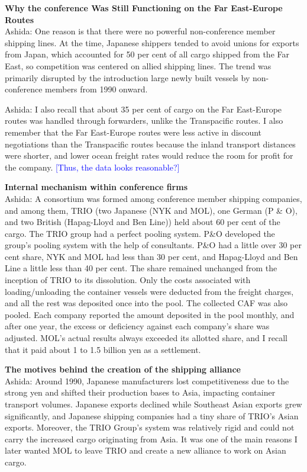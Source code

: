 \textbf{Why the conference Was Still Functioning on the Far East-Europe Routes}\\
Ashida: One reason is that there were no powerful non-conference member shipping lines. At the time, Japanese shippers tended to avoid unions for exports from Japan, which accounted for 50 per cent of all cargo shipped from the Far East, so competition was centered on allied shipping lines. The trend was primarily disrupted by the introduction large newly built vessels by non-conference members from 1990 onward.

Ashida: I also recall that about 35 per cent of cargo on the Far East-Europe routes was handled through forwarders, unlike the Transpacific routes. I also remember that the Far East-Europe routes were less active in discount negotiations than the Transpacific routes because the inland transport distances were shorter, and lower ocean freight rates would reduce the room for profit for the company. \textcolor{blue}{[Thus, the data looks reasonable?]}

\textbf{Internal mechanism within conference firms} \\
Ashida: A consortium was formed among conference member shipping companies, and among them, TRIO (two Japanese (NYK and MOL), one German (P \& O), and two British (Hapag-Lloyd and Ben Line)) held about 60 per cent of the cargo. The TRIO group had a perfect pooling system. P\&O developed the group's pooling system with the help of consultants. P\&O had a little over 30 per cent share, NYK and MOL had less than 30 per cent, and Hapag-Lloyd and Ben Line a little less than 40 per cent. The share remained unchanged from the inception of TRIO to its dissolution. Only the costs associated with loading/unloading the container vessels were deducted from the freight charges, and all the rest was deposited once into the pool. The collected CAF was also pooled. Each company reported the amount deposited in the pool monthly, and after one year, the excess or deficiency against each company's share was adjusted. MOL's actual results always exceeded its allotted share, and I recall that it paid about 1 to 1.5 billion yen as a settlement.

\textbf{The motives behind the creation of the shipping alliance}\\
Ashida: Around 1990, Japanese manufacturers lost competitiveness due to the strong yen and shifted their production bases to Asia, impacting container transport volumes. Japanese exports declined while Southeast Asian exports grew significantly, and Japanese shipping companies had a tiny share of TRIO's Asian exports. Moreover, the TRIO Group's system was relatively rigid and could not carry the increased cargo originating from Asia. It was one of the main reasons I later wanted MOL to leave TRIO and create a new alliance to work on Asian cargo.

